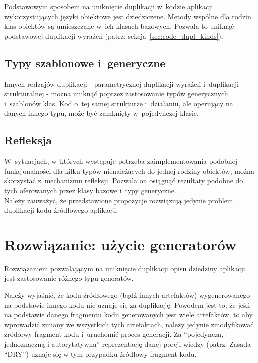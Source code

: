 Podstawowym sposobem na uniknięcie duplikacji w~kodzie aplikacji wykorzystujących języki obiektowe jest dziedziczene.
Metody wspólne dla rodzin klas obiektów są umieszczane w~ich klasach bazowych.
Pozwala to uniknąć podstawowej duplikacji wyrażeń (patrz: sekcja~\ref{sec:code_dupl_kinds}).


\subsection{Typy szablonowe i~generyczne}

Innych rodzajów duplikacji - parametrycznej duplikacji wyrażeń i~duplikacji strukturalnej - można uniknąć poprzez zastosowanie typów generycznych i~szablonów klas.
Kod o~tej samej strukturze i~działaniu, ale operujący na danych innego typu, może być zamknięty w~pojedynczej klasie.


\subsection{Refleksja}

W~sytuacjach, w~których występuje potrzeba zaimplementowania podobnej funkcjonalności dla kilku typów nienależących do jednej rodziny obiektów, można skorzystać z~mechanizmu refleksji.
Pozwala on osiągnąć rezultaty podobne do tych oferowanych przez klasy bazowe i~typy generyczne.\\


Należy zauważyć, że przedstawione propozycje rozwiązują jedynie problem duplikacji kodu źródłowego aplikacji.


\section{Rozwiązanie: użycie generatorów}

Rozwiązaniem pozwalającym na uniknięcie duplikacji opisu dziedziny aplikacji jest zastosowanie różnego typu generatów.

Należy wyjaśnić, że kodu źródłowego (bądź innych artefaktów) wygenerowanego na podstawie innego kodu nie uznaje się za duplikację.
Powodem jest to, że jeśli na podstawie danego fragmentu kodu generowanych jest wiele artefaktów, to aby wprowadzić zmiany we wszystkich tych artefaktach, należy jedynie  zmodyfikować źródłowy fragment kodu i~uruchomić proces generacji.
Za ``pojedynczą, jednoznaczną i autorytatywną'' reprezentację danej porcji wiedzy (patrz: Zasada ``DRY'') uznaje się w tym przypadku źródłowy fragment kodu.


